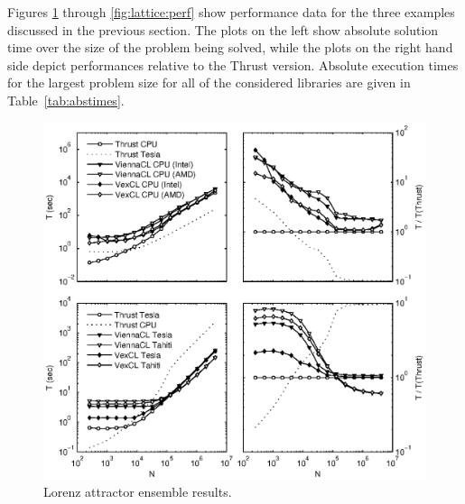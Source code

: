 \documentclass[final]{siamltex}
\begin{document}
Figures \ref{fig:lorenz:perf} through \ref{fig:lattice:perf} show performance
data for the three examples discussed in the previous section.  The plots on
the left show absolute solution time over the size of the problem being solved, while
the plots on the right hand side depict performances relative to the Thrust
version.  Absolute execution times for the largest problem size for all of the
considered libraries are given in Table~\ref{tab:abstimes}.

\begin{figure}
    \begin{center}
      \includegraphics[width=\textwidth]{data/lorenz_ensemble/perfmtx}
    \end{center}
    \caption{Lorenz attractor ensemble results.}
    \label{fig:lorenz:perf}
\end{figure}
\end{document}
